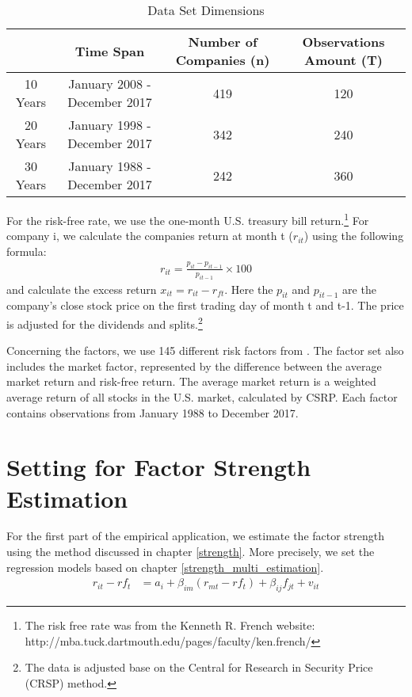 \begin{table}[H]
	\centering
		\caption{Data Set Dimensions}
			\label{Data_set}
	\begin{tabular}{c|ccc}
		\hline
		& Time Span                    & Number of Companies (n) & Observations Amount (T) \\ \hline
		10 Years & January 2008 - December 2017 & 419                  & 120                     \\
		20 Years & January 1998 - December 2017 & 342                  & 240                     \\
		30 Years & January 1988 - December 2017 & 242                  & 360                     \\ \hline
	\end{tabular}
\end{table}
For the risk-free rate, we use the one-month U.S. treasury bill return.\footnote{ The risk free rate was from the Kenneth R. French website: http://mba.tuck.dartmouth.edu/pages/faculty/ken.french/}
For company i, we calculate the companies return at month t ($r_{it}$) using the following formula:
\begin{align*}
r_{it} = \frac{p_{i t} - p_{i t-1}}{p_{i t-1}}\times 100
\end{align*}
and calculate the excess return $x_{it} = r_{it} - r_{ft}$.
Here the $p_{it}$ and $p_{i t-1}$ are the company's close stock price on the first trading day of month t and t-1.
The price is adjusted for the dividends and splits.\footnote{The data is adjusted base on the Central for Research in Security Price (CRSP) method.}

Concerning the factors, we use 145 different risk factors from .
The factor set also includes the market factor, represented by the difference between the average market return and risk-free return.
The average market return is a weighted average return of all stocks in the U.S. market, calculated by CSRP.
Each factor contains observations from January 1988 to December 2017.

\section{Setting for Factor Strength Estimation}
For the first part of the empirical application, we estimate the factor strength using the method discussed in chapter \ref{strength}.
More precisely, we set the regression models based on chapter \ref{strength_multi_estimation}.
\begin{align*}
r_{it} - rf_{t} &= a_i + \beta_{im}(r_{mt} - rf_{t}) + \beta_{ij}f_{jt} + v_{it} 
\end{align*}

